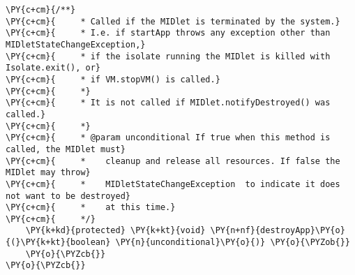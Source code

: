 \begin{Verbatim}[commandchars=\\\{\}]
    \PY{c+cm}{/**}
\PY{c+cm}{     * Called if the MIDlet is terminated by the system.}
\PY{c+cm}{     * I.e. if startApp throws any exception other than MIDletStateChangeException,}
\PY{c+cm}{     * if the isolate running the MIDlet is killed with Isolate.exit(), or}
\PY{c+cm}{     * if VM.stopVM() is called.}
\PY{c+cm}{     *}
\PY{c+cm}{     * It is not called if MIDlet.notifyDestroyed() was called.}
\PY{c+cm}{     *}
\PY{c+cm}{     * @param unconditional If true when this method is called, the MIDlet must}
\PY{c+cm}{     *    cleanup and release all resources. If false the MIDlet may throw}
\PY{c+cm}{     *    MIDletStateChangeException  to indicate it does not want to be destroyed}
\PY{c+cm}{     *    at this time.}
\PY{c+cm}{     */}
    \PY{k+kd}{protected} \PY{k+kt}{void} \PY{n+nf}{destroyApp}\PY{o}{(}\PY{k+kt}{boolean} \PY{n}{unconditional}\PY{o}{)} \PY{o}{\PYZob{}}
    \PY{o}{\PYZcb{}}
\PY{o}{\PYZcb{}}
\end{Verbatim}
